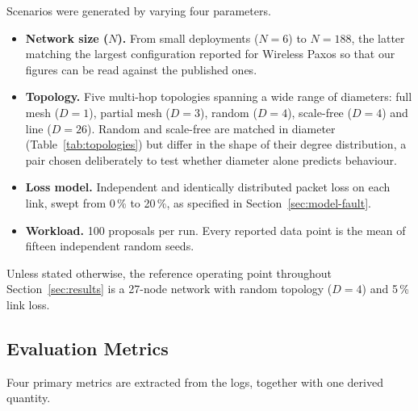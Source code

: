 \documentclass[journal]{IEEEtran}
\newcommand{\Nnodes}{N}                   %
\newcommand{\Diam}{D}                     %
\begin{document}
Scenarios were generated by varying four parameters.

\begin{itemize}
\item \textbf{Network size ($\Nnodes$).} From small deployments
($\Nnodes = 6$) to $\Nnodes = 188$, the latter matching the largest
configuration reported for Wireless Paxos \cite{poirot19paxos} so that
our figures can be read against the published ones.

\item \textbf{Topology.} Five multi-hop topologies spanning a wide range
of diameters: full mesh ($\Diam = 1$), partial mesh ($\Diam = 3$), random
($\Diam = 4$), scale-free ($\Diam = 4$) and line ($\Diam = 26$). Random
and scale-free are matched in diameter (Table~\ref{tab:topologies}) but
differ in the shape of their degree distribution, a pair chosen deliberately
to test whether diameter alone predicts behaviour.

\item \textbf{Loss model.} Independent and identically distributed packet
loss on each link, swept from 0\,\% to 20\,\%, as specified in
Section~\ref{sec:model-fault}.

\item \textbf{Workload.} 100 proposals per run. Every reported data point
is the mean of fifteen independent random seeds.
\end{itemize}

Unless stated otherwise, the reference operating point throughout
Section~\ref{sec:results} is a 27-node network with random topology
($\Diam = 4$) and 5\,\% link loss.

\subsection{Evaluation Metrics}
\label{sec:method-metrics}

Four primary metrics are extracted from the logs, together with one
derived quantity.
\end{document}
